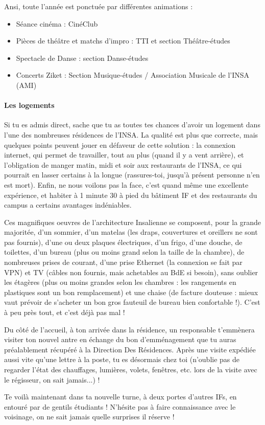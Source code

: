 Ansi, toute l'année est ponctuée par différentes animations :
\begin{itemize}
\item  Séance cinéma : CinéClub
\item  Pièces de théâtre et matchs d'impro : TTI et section Théâtre-études
\item  Spectacle de Danse : section Danse-études
\item  Concerts Ziket : Section Musique-études / Association Musicale de l'INSA (AMI) 
\end{itemize}

\paragraph{Les logements}
Si tu es admis direct, sache que tu as toutes tes chances d'avoir un logement
dans l'une des nombreuses résidences de l'INSA. La qualité est plus que correcte,
mais quelques points peuvent jouer en défaveur de cette solution : la connexion internet, qui
permet de travailler, tout au plus (quand il y a
vent arrière), et l'obligation de manger matin, midi et soir aux
restaurants de l'INSA, ce qui pourrait en lasser certains à la longue (rassures-toi, jusqu'à présent personne n'en est mort).
Enfin, ne nous voilons pas la face, c'est quand même une excellente expérience,
et habiter à 1 minute 30 à pied du bâtiment IF et des restaurants du campus a certains avantages indéniables.

\vspace{1em}

Ces magnifiques oeuvres de l'architecture Insalienne se composent, pour la
grande majoritée, d'un sommier, d'un matelas (les draps, couvertures et
oreillers ne sont pas fournis), d'une ou deux plaques électriques, d'un frigo,
d'une douche, de toilettes, d'un bureau (plus ou moins grand selon la taille de la
chambre), de nombreuses prises de courant, d'une prise Ethernet (la
connexion se fait par VPN) et TV (câbles non fournis, mais
achetables au BdE si besoin), sans oublier les étagères (plus ou moins grandes
selon les chambres : les rangements en plastiques sont
un bon remplacement) et une chaise (de facture douteuse : mieux vaut prévoir de
s'acheter un bon gros fauteuil de bureau bien confortable !). C'est à peu près tout, et c'est déjà pas mal !

\vspace{1em}

Du côté de l'accueil, à ton arrivée dans la résidence, un responsable t'emmènera visiter ton
nouvel antre en échange du bon d'emménagement que tu auras préalablement
récupéré à la Direction Des Résidences. Après une visite expédiée aussi vite
qu'une lettre à la poste, tu es désormais chez toi (n'oublie pas de regarder
l'état des chauffages, lumières, volets, fenêtres,  etc. lors de la visite
avec le régisseur, on sait jamais...) !

\vspace{1em}

Te voilà maintenant dans ta nouvelle turne, à deux portes d'autres IFs, en entouré par de gentils étudiants !
N'hésite pas à faire connaissance avec le voisinage, on ne sait jamais quelle surprises il réserve !
